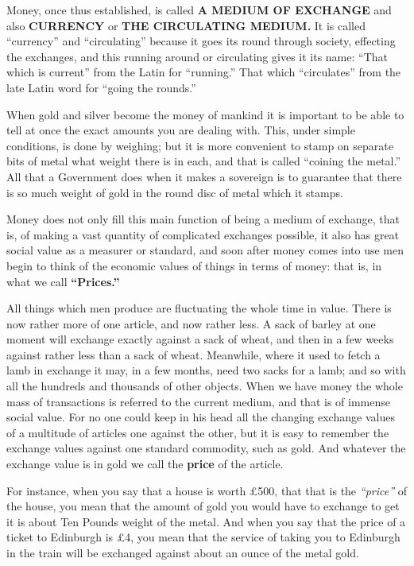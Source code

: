 \documentclass{book}
\begin{document}
Money, once thus established, is called \textbf{A MEDIUM OF EXCHANGE} and also \textbf{CURRENCY} or \textbf{THE CIRCULATING MEDIUM.} It is called “currency” and “circulating” because it goes its round through society, effecting the exchanges, and this running around or circulating gives it its name: “That which is current” from the Latin for “running.” That which “circulates” from the late Latin word for “going the rounds.”

When gold and silver become the money of mankind it is important to be able to tell at once the exact amounts you are dealing with. This, under simple conditions, is done by weighing; but it is more convenient to stamp on separate bits of metal what weight there is in each, and that is called “coining the metal.” All that a Government does when it makes a sovereign is to guarantee that there is so much weight of gold in the round disc of metal which it stamps.

Money does not only fill this main function of being a medium of exchange, that is, of making a vast quantity of complicated exchanges possible, it also has great social value as a measurer or standard, and soon after money comes into use men begin to think of the economic values of things in terms of money: that is, in what we call \textbf{“Prices.”}

All things which men produce are fluctuating the whole time in value. There is now rather more of one article, and now rather less. A sack of barley at one moment will exchange exactly against a sack of wheat, and then in a few weeks against rather less than a sack of wheat. Meanwhile, where it used to fetch a lamb in exchange it may, in a few months, need two sacks for a lamb; and so with all the hundreds and thousands of other objects. When we have money the whole mass of transactions is referred to the current medium, and that is of immense social value. For no one could keep in his head all the changing exchange values of a multitude of articles one against the other, but it is easy to remember the exchange values against one standard commodity, such as gold. And whatever the exchange value is in gold we call the \textbf{price} of the article.

For instance, when you say that a house is worth £500, that that is the \emph{“price”} of the house, you mean that the amount of gold you would have to exchange to get it is about Ten Pounds weight of the metal. And when you say that the price of a ticket to Edinburgh is £4, you mean that the service of taking you to Edinburgh in the train will be exchanged against about an ounce of the metal gold.
\end{document}
